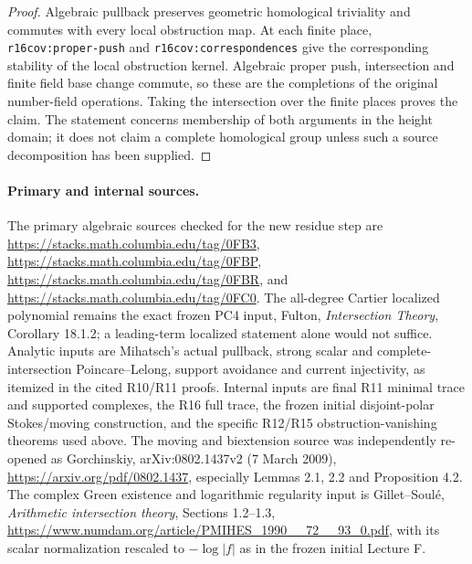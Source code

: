 \begin{proof}
Algebraic pullback preserves geometric homological triviality and
commutes with every local obstruction map. At each finite place,
\texttt{r16cov:proper-push} and
\texttt{r16cov:correspondences} give the corresponding stability
of the local obstruction kernel. Algebraic proper push,
intersection and finite field base change commute, so these are
the completions of the original number-field operations.
Taking the intersection over the finite places proves the claim.
The statement concerns membership of both arguments in the
height domain; it does not claim a complete homological group
unless such a source decomposition has been supplied.
\end{proof}

\paragraph{Primary and internal sources.}
The primary algebraic sources checked for the new residue step are
\url{https://stacks.math.columbia.edu/tag/0FB3},
\url{https://stacks.math.columbia.edu/tag/0FBP},
\url{https://stacks.math.columbia.edu/tag/0FBR}, and
\url{https://stacks.math.columbia.edu/tag/0FC0}.
The all-degree Cartier localized polynomial remains the exact frozen
PC4 input, Fulton, \emph{Intersection Theory}, Corollary 18.1.2;
a leading-term localized statement alone would not suffice.
Analytic inputs are Mihatsch's actual pullback, strong scalar and
complete-intersection Poincare--Lelong, support avoidance and current
injectivity, as itemized in the cited R10/R11 proofs. Internal inputs
are final R11 minimal trace and supported complexes, the R16 full
trace, the frozen initial disjoint-polar Stokes/moving construction,
and the specific R12/R15 obstruction-vanishing theorems used above.
The moving and biextension source was independently re-opened as
Gorchinskiy, arXiv:0802.1437v2 (7 March 2009),
\url{https://arxiv.org/pdf/0802.1437}, especially Lemmas 2.1, 2.2
and Proposition 4.2. The complex Green existence and logarithmic
regularity input is Gillet--Soul\'e, \emph{Arithmetic intersection
theory}, Sections 1.2--1.3,
\url{https://www.numdam.org/article/PMIHES_1990__72__93_0.pdf},
with its scalar normalization rescaled to $-\log|f|$ as in the
frozen initial Lecture F.
